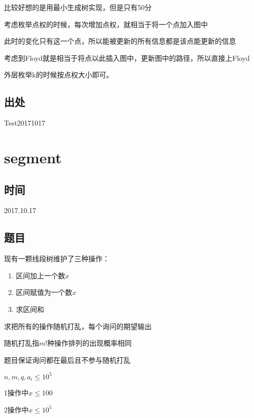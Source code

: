 \documentclass[a4paper]{article}
\begin{document}
		比较好想的是用最小生成树实现，但是只有50分
		
		考虑枚举点权的时候，每次增加点权，就相当于将一个点加入图中
		
		此时的变化只有这一个点，所以能被更新的所有信息都是该点能更新的信息
		
		考虑到Floyd就是相当于将点以此插入图中，更新图中的路径，所以直接上Floyd
		
		外层枚举k的时候按点权大小即可。
		
	\subsection{出处}
		
		Test20171017
	
	\newpage
	
	\section{segment}
		
	\subsection{时间}
		
		2017.10.17
		
	\subsection{题目}
		
		现有一颗线段树维护了三种操作：
		
		\begin{enumerate}
		
			\item 区间加上一个数$x$
			
			\item 区间赋值为一个数$x$
			
			\item 求区间和
		
		\end{enumerate}
		
		求把所有的操作随机打乱，每个询问的期望输出
		
		随机打乱指$m!$种操作排列的出现概率相同
		
		题目保证询问都在最后且不参与随机打乱
		
		$n,m,q,a_i \leq 10^5$
		
		1操作中$x \leq 100$
		
		2操作中$x \leq 10^5$
		
\end{document}
